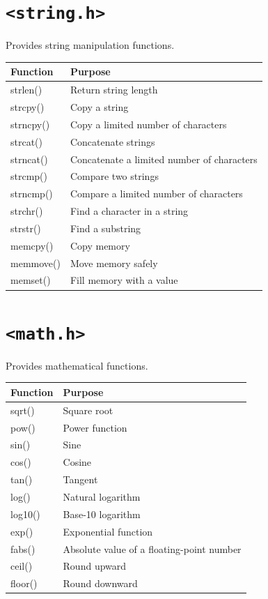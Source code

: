 \documentclass[12pt,openany]{book}
\begin{document}
\section{\texttt{<string.h>}}

Provides string manipulation functions.

\begin{center}
\begin{tabular}{|l|p{8cm}|}
\hline
Function & Purpose \\
\hline
strlen() & Return string length \\
strcpy() & Copy a string \\
strncpy() & Copy a limited number of characters \\
strcat() & Concatenate strings \\
strncat() & Concatenate a limited number of characters \\
strcmp() & Compare two strings \\
strncmp() & Compare a limited number of characters \\
strchr() & Find a character in a string \\
strstr() & Find a substring \\
memcpy() & Copy memory \\
memmove() & Move memory safely \\
memset() & Fill memory with a value \\
\hline
\end{tabular}
\end{center}

\section{\texttt{<math.h>}}

Provides mathematical functions.

\begin{center}
\begin{tabular}{|l|p{8cm}|}
\hline
Function & Purpose \\
\hline
sqrt() & Square root \\
pow() & Power function \\
sin() & Sine \\
cos() & Cosine \\
tan() & Tangent \\
log() & Natural logarithm \\
log10() & Base-10 logarithm \\
exp() & Exponential function \\
fabs() & Absolute value of a floating-point number \\
ceil() & Round upward \\
floor() & Round downward \\
\hline
\end{tabular}
\end{center}
\end{document}
